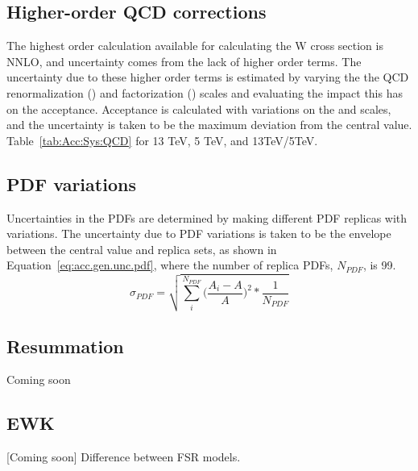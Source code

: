 \subsection{Higher-order QCD corrections}

The highest order calculation available for calculating the W cross section is NNLO, and uncertainty comes from the lack of higher order terms. The uncertainty due to these higher order terms is estimated by varying the the QCD renormalization (\mur) and factorization (\muf) scales and evaluating the impact this has on the acceptance. Acceptance is calculated with variations on the \mur and \muf scales, and the uncertainty is taken to be the maximum deviation from the central value. Table~\ref{tab:Acc:Sys:QCD} for 13 TeV, 5 TeV, and 13TeV/5TeV.




\subsection{PDF variations}
Uncertainties in the PDFs are determined by making different PDF replicas with variations. The uncertainty due to PDF variations is taken to be the envelope between the central value and replica sets, as shown in Equation~\ref{eq:acc.gen.unc.pdf}, where the number of replica PDFs, $N_{PDF}$, is 99.
\begin{equation}
\sigma_{PDF}=\sqrt{\sum_{i}^{N_{PDF}} \Bigg(\frac{A_{i}-A}{A}\Bigg)^2*\frac{1}{N_{PDF}}}
\label{eq:acc.gen.unc.pdf}
\end{equation}



\subsection{Resummation}
Coming soon
\subsection{EWK}
[Coming soon] Difference between FSR models.
% 
% 
% 
% 


% 
% 
% 

